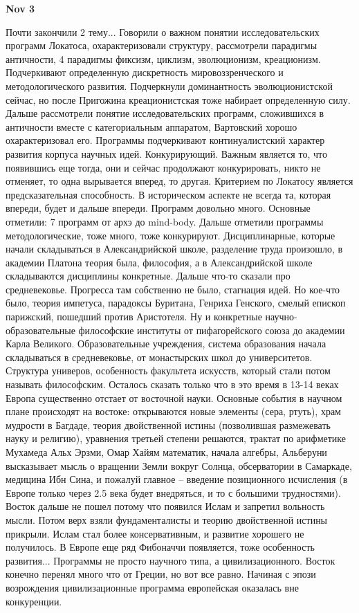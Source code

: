 \documentclass[a4paper, 12pt]{article}
\begin{document}
\hfill \textbf{Nov 3}

Почти закончили 2 тему... Говорили о важном понятии исследовательских 
программ Локатоса, охарактеризовали структуру, рассмотрели парадигмы 
античности, 4 парадигмы фиксизм, циклизм, эволюционизм, креационизм. 
Подчеркивают определенную дискретность мировоззренческого 
и методологического развития. Подчеркнули доминантность эволюционистской 
сейчас, но после Пригожина креационистская тоже набирает определенную 
силу. Дальше рассмотрели понятие исследовательских программ, сложившихся 
в античности вместе с категориальным аппаратом, Вартовский хорошо 
охарактеризовал его. Программы подчеркивают континуалистский характер 
развития корпуса научных идей. Конкурирующий. Важным является то, что 
появившись еще тогда, они и сейчас продолжают конкурировать, никто не 
отменяет, то одна вырывается вперед, то другая. Критерием по Локатосу 
является предсказательная способность. В историческом аспекте не всегда 
та, которая впереди, будет и дальше впереди. Программ довольно много. 
Основные отметили: 7 программ от архэ до mind-body. Дальше отметили 
программы методологические, тоже много, тоже конкурируют. 
Дисциплинарные, которые начали складываться в Александрийской школе, 
разделение труда произошло, в академии Платона теория была, философия, 
а в Александрийской школе складываются дисциплины конкретные. Дальше 
что-то сказали про средневековье. Прогресса там собственно не было, 
стагнация идей. Но кое-что было, теория импетуса, парадоксы Буритана, 
Генриха Генского, смелый епископ парижский, пошедший против Аристотеля. 
Ну и конкретные научно-образовательные философские институты от 
пифагорейского союза до академии Карла Великого. Образовательные 
учреждения, система образования начала складываться в средневековье, от 
монастырских школ до университетов. Структура универов, особенность 
факультета искусств, который стали потом называть философским. Осталось 
сказать только что в это время в 13-14 веках Европа существенно отстает 
от восточной науки. Основные события в научном плане происходят на 
востоке: открываются новые элементы (сера, ртуть), храм мудрости 
в Багдаде, теория двойственной истины (позволившая размежевать науку 
и религию), уравнения третьей степени решаются, трактат по арифметике 
Мухамеда Альх Эрзми, Омар Хайям математик, начала алгебры, Альберуни 
высказывает мысль о вращении Земли вокруг Солнца, обсерватории 
в Самаркаде, медицина Ибн Сина, и пожалуй главное -- введение 
позиционного исчисления (в Европе только через 2.5 века будет 
внедряться, и то с большими трудностями). Восток дальше не пошел потому 
что появился Ислам и запретил вольность мысли. Потом верх взяли 
фундаменталисты и теорию двойственной истины прикрыли. Ислам стал более 
консервативным, и развитие хорошего не получилось. В Европе еще ряд 
Фибоначчи появляется, тоже особенность развития... Программы не просто 
научного типа, а цивилизационного. Восток конечно перенял много что от 
Греции, но вот все равно. Начиная с эпози возрождения цивилизационные 
программа европейская оказалась вне конкуренции.
\end{document}
